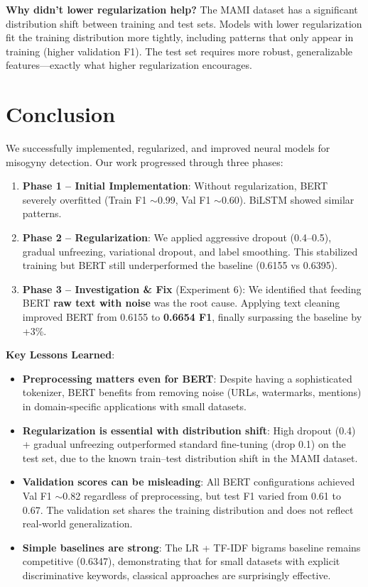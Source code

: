\documentclass{article}
\begin{document}
\textbf{Why didn't lower regularization help?} The MAMI dataset has a significant distribution shift between training and test sets. Models with lower regularization fit the training distribution more tightly, including patterns that only appear in training (higher validation F1). The test set requires more robust, generalizable features---exactly what higher regularization encourages.

\section{Conclusion}
We successfully implemented, regularized, and improved neural models for misogyny detection. Our work progressed through three phases:

\begin{enumerate}
    \item \textbf{Phase 1 -- Initial Implementation}: Without regularization, BERT severely overfitted (Train F1 $\sim$0.99, Val F1 $\sim$0.60). BiLSTM showed similar patterns.
    
    \item \textbf{Phase 2 -- Regularization}: We applied aggressive dropout (0.4--0.5), gradual unfreezing, variational dropout, and label smoothing. This stabilized training but BERT still underperformed the baseline (0.6155 vs 0.6395).
    
    \item \textbf{Phase 3 -- Investigation \& Fix} (Experiment 6): We identified that feeding BERT \textbf{raw text with noise} was the root cause. Applying text cleaning improved BERT from 0.6155 to \textbf{0.6654 F1}, finally surpassing the baseline by +3\%.
\end{enumerate}

\textbf{Key Lessons Learned}:
\begin{itemize}
    \item \textbf{Preprocessing matters even for BERT}: Despite having a sophisticated tokenizer, BERT benefits from removing noise (URLs, watermarks, mentions) in domain-specific applications with small datasets.
    \item \textbf{Regularization is essential with distribution shift}: High dropout (0.4) + gradual unfreezing outperformed standard fine-tuning (drop 0.1) on the test set, due to the known train--test distribution shift in the MAMI dataset.
    \item \textbf{Validation scores can be misleading}: All BERT configurations achieved Val F1 $\sim$0.82 regardless of preprocessing, but test F1 varied from 0.61 to 0.67. The validation set shares the training distribution and does not reflect real-world generalization.
    \item \textbf{Simple baselines are strong}: The LR + TF-IDF bigrams baseline remains competitive (0.6347), demonstrating that for small datasets with explicit discriminative keywords, classical approaches are surprisingly effective.
\end{itemize}
\end{document}
